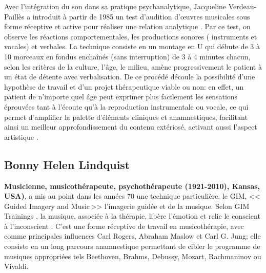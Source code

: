 Avec l'intégration du son dans sa pratique psychanalytique, 
Jacqueline Verdeau-Paillès a introduit  à partir de 1985  un test d'audition d'\oe uvres musicales
sous forme réceptive et active pour réaliser
une relation analytique \autocite{verdeau-pailles:bilan}.
Par ce test, on
observe les réactions comportementales, les productions sonores (
instruments et vocales) et verbales. La technique consiste en un montage en U qui débute de 3 à 10
morceaux en fondus enchaînés (sans interruption) de 3 à 4 minutes chacun, selon les
critères de la culture, l'âge, le milieu,
amène progressivement le patient à un état de détente
avec verbalisation. De ce procédé découle la possibilité 
d'une hypothèse de
travail et d'un projet thérapeutique viable ou non:
en effet, un patient de n'importe quel âge peut exprimer plus facilement les
sensations éprouvées tant à l'écoute qu'à la reproduction
instrumentale ou vocale, ce qui permet d'amplifier la palette d'éléments
cliniques et anamnestiques, facilitant ainsi un meilleur approfondissement du
contenu extériosé, activant aussi l'aspect artistique
\autocite{verdeau_expression}.



\subsection{Bonny Helen Lindquist} 

\textbf{ Musicienne, musicothérapeute, psychothérapeute (1921-2010), Kansas, USA)},
a mis au point dans les années 70
une technique particulière, le GIM, <<\,Guided Imagery and Music\,>>
l'imagerie guidée et de la musique. Selon GIM
Trainings \autocite{gim_site}, la
musique, associée à la thérapie, libère l'émotion et relie le
conscient à l'inconscient \autocite{bonny_gim}.
 C'est une forme réceptive de travail
 en musicothérapie, avec comme principales influences Carl Rogers,
 Abraham Maslow  \autocite{maslow-key}
et Carl G. Jung; 
elle  consiste en un long parcours  anamnestique permettant de cibler le programme de musiques appropriées tels Beethoven, Brahms, Debussy,
Mozart, Rachmaninov ou Vivaldi.

